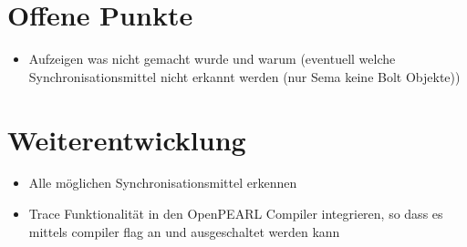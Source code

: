 \section{Offene Punkte}
\begin{itemize}
  \item Aufzeigen was nicht gemacht wurde und warum (eventuell welche
  Synchronisationsmittel nicht erkannt werden (nur Sema keine Bolt Objekte))
\end{itemize}

\section{Weiterentwicklung}
\begin{itemize}
  \item Alle möglichen Synchronisationsmittel erkennen
  \item Trace Funktionalität in den OpenPEARL Compiler integrieren, so dass es
  mittels compiler flag an und ausgeschaltet werden kann
\end{itemize}